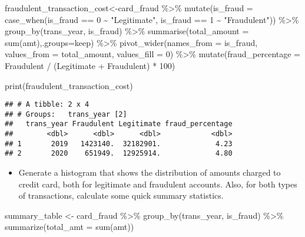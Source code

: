 \documentclass[
]{article}
\newenvironment{Shaded}{\begin{snugshade}}{\end{snugshade}}
\newcommand{\AttributeTok}[1]{\textcolor[rgb]{0.77,0.63,0.00}{#1}}
\newcommand{\DecValTok}[1]{\textcolor[rgb]{0.00,0.00,0.81}{#1}}
\newcommand{\FunctionTok}[1]{\textcolor[rgb]{0.00,0.00,0.00}{#1}}
\newcommand{\NormalTok}[1]{#1}
\newcommand{\OtherTok}[1]{\textcolor[rgb]{0.56,0.35,0.01}{#1}}
\newcommand{\SpecialCharTok}[1]{\textcolor[rgb]{0.00,0.00,0.00}{#1}}
\newcommand{\StringTok}[1]{\textcolor[rgb]{0.31,0.60,0.02}{#1}}
\providecommand{\tightlist}{%
  \setlength{\itemsep}{0pt}\setlength{\parskip}{0pt}}
\begin{document}
\begin{Shaded}
\begin{Highlighting}[]
\NormalTok{fraudulent\_transaction\_cost}\OtherTok{\textless{}{-}}\NormalTok{card\_fraud }\SpecialCharTok{\%\textgreater{}\%}
  \FunctionTok{mutate}\NormalTok{(}\AttributeTok{is\_fraud =} \FunctionTok{case\_when}\NormalTok{(is\_fraud }\SpecialCharTok{==} \DecValTok{0} \SpecialCharTok{\textasciitilde{}} \StringTok{"Legitimate"}\NormalTok{, is\_fraud }\SpecialCharTok{==} \DecValTok{1} \SpecialCharTok{\textasciitilde{}} \StringTok{"Fraudulent"}\NormalTok{)) }\SpecialCharTok{\%\textgreater{}\%}
  \FunctionTok{group\_by}\NormalTok{(trans\_year, is\_fraud) }\SpecialCharTok{\%\textgreater{}\%}
  \FunctionTok{summarise}\NormalTok{(}\AttributeTok{total\_amount =} \FunctionTok{sum}\NormalTok{(amt),}\AttributeTok{.groups=}\StringTok{\textquotesingle{}keep\textquotesingle{}}\NormalTok{) }\SpecialCharTok{\%\textgreater{}\%}
  \FunctionTok{pivot\_wider}\NormalTok{(}\AttributeTok{names\_from =}\NormalTok{ is\_fraud, }\AttributeTok{values\_from =}\NormalTok{ total\_amount, }\AttributeTok{values\_fill =} \DecValTok{0}\NormalTok{) }\SpecialCharTok{\%\textgreater{}\%}
  \FunctionTok{mutate}\NormalTok{(}\AttributeTok{fraud\_percentage =}\NormalTok{ Fraudulent }\SpecialCharTok{/}\NormalTok{ (Legitimate }\SpecialCharTok{+}\NormalTok{ Fraudulent) }\SpecialCharTok{*} \DecValTok{100}\NormalTok{)}

\FunctionTok{print}\NormalTok{(fraudulent\_transaction\_cost)}
\end{Highlighting}
\end{Shaded}

\begin{verbatim}
## # A tibble: 2 x 4
## # Groups:   trans_year [2]
##   trans_year Fraudulent Legitimate fraud_percentage
##        <dbl>      <dbl>      <dbl>            <dbl>
## 1       2019   1423140.  32182901.             4.23
## 2       2020    651949.  12925914.             4.80
\end{verbatim}

\begin{itemize}
\tightlist
\item
  Generate a histogram that shows the distribution of amounts charged to
  credit card, both for legitimate and fraudulent accounts. Also, for
  both types of transactions, calculate some quick summary statistics.
\end{itemize}

\begin{Shaded}
\begin{Highlighting}[]
\NormalTok{summary\_table }\OtherTok{\textless{}{-}}\NormalTok{ card\_fraud }\SpecialCharTok{\%\textgreater{}\%}
  \FunctionTok{group\_by}\NormalTok{(trans\_year, is\_fraud) }\SpecialCharTok{\%\textgreater{}\%}
  \FunctionTok{summarize}\NormalTok{(}\AttributeTok{total\_amt =} \FunctionTok{sum}\NormalTok{(amt))}
\end{Highlighting}
\end{Shaded}
\end{document}
